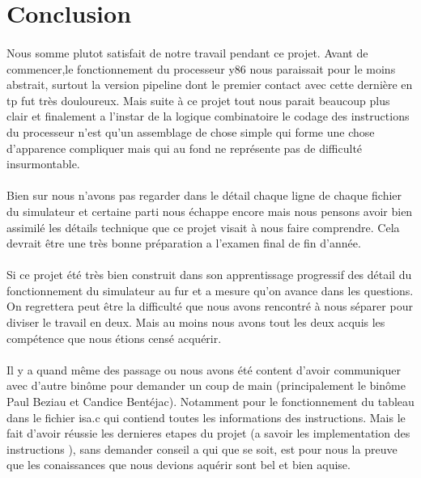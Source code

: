 \documentclass[12pt]{article}
\begin{document}
\newpage

\section{Conclusion}

\paragraph{} Nous somme plutot satisfait de notre travail pendant ce projet. Avant de commencer,le fonctionnement du processeur y86 nous paraissait pour le moins abstrait, surtout la version pipeline dont le premier contact avec cette dernière en tp fut très douloureux. Mais suite à ce projet tout nous parait beaucoup plus clair et finalement a l'instar de la logique combinatoire le codage des instructions du processeur n'est qu'un assemblage de chose simple qui forme une chose d'apparence compliquer mais qui au fond ne représente pas de difficulté insurmontable.

\paragraph{} Bien sur nous n'avons pas regarder dans le détail chaque ligne de chaque fichier du simulateur et certaine parti nous échappe encore mais nous pensons avoir bien assimilé les détails technique que ce projet visait à nous faire comprendre. Cela devrait être une très bonne préparation a l’examen final de fin d'année.

\paragraph{} Si ce projet été très bien construit dans son apprentissage progressif des détail du fonctionnement du simulateur au fur et a mesure qu'on avance dans les questions. On regrettera peut être la difficulté que nous avons rencontré à nous séparer pour diviser le travail en deux. Mais au moins nous avons tout les deux acquis les compétence que nous étions censé acquérir.

\paragraph{} Il y a quand même des passage ou nous avons été content d'avoir communiquer avec d'autre binôme pour demander un coup de main (principalement le binôme Paul Beziau et Candice Bentéjac). Notamment pour le fonctionnement du tableau dans le fichier isa.c qui contiend toutes les informations des instructions.
Mais le fait d'avoir réussie les dernieres etapes du projet (a savoir les implementation des instructions ), sans demander conseil a qui que se soit, est pour nous la preuve que les conaissances que nous devions aquérir sont bel et bien aquise.
\end{document}
